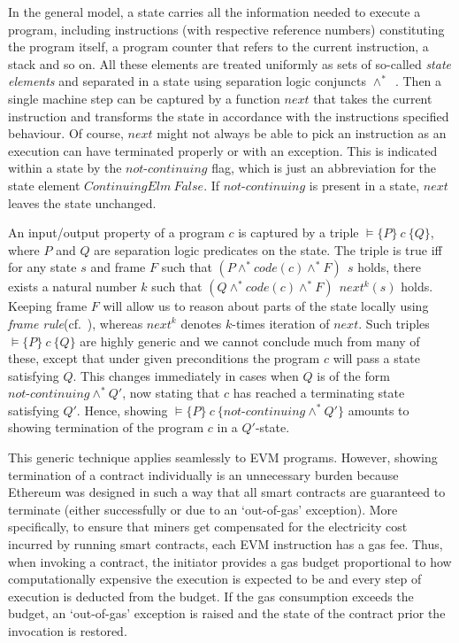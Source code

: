 \documentclass[sigplan,10pt,review]{acmart}\settopmatter{printfolios=true,printccs=false,printacmref=false}
\newcommand{\sconj}{\wedge^*}
\newcommand{\pvalid}[3]{\models\{#1\}\:#2\:\{#3\}}
\newcommand{\xnext}{\mathit{next}}
\newcommand{\code}[1]{\mathit{code}(#1)}
\newcommand{\ncont}{\mathit{not\mbox{-}continuing}}
\begin{document}
In the general model, a state carries all the information needed to execute a program, including
instructions (with respective reference numbers) constituting the program itself, a program counter that
refers to the current instruction, a stack and so on. All these elements are treated uniformly 
as sets of so-called \emph{state elements}
and separated in a state using separation logic conjuncts $\sconj$~\cite{Reynolds_02}.  
Then a single machine step can be captured by a function $\xnext$ that 
takes the current instruction and transforms the state in accordance with the instructions
specified behaviour. Of course, $\xnext$ might not always be able to pick an instruction
as an execution can have terminated properly or with an exception. This is indicated within a state
by the $\ncont$ flag, which is just an abbreviation for the state element 
$\mathit{ContinuingElm}\:False$. If $\ncont$ is present in a state, $\xnext$
leaves the state unchanged.   
   
An input/output property of a program $c$ is captured by a triple
$\pvalid{P}{c}{Q}$, where $P$ and $Q$ are separation logic predicates on the state.
The triple is true iff for any state $s$ and frame $F$ such that
$(P \sconj \code{c} \sconj F)\:\ s$ holds, there exists a natural number $k$ such that 
$(Q \sconj \code{c} \sconj F)\:\ \xnext^k(s)$ holds. 
Keeping frame $F$ will allow us to reason about parts of the state locally using \emph{frame rule}(cf.~\cite{Reynolds_02}),
whereas $\xnext^k$ denotes $k$-times iteration of $\xnext$.
Such triples $\pvalid{P}{c}{Q}$ are highly generic and we cannot conclude much from many of these, except that
under given preconditions the program $c$ will pass a state satisfying $Q$. This changes immediately in cases when $Q$ is of
the form $\ncont \sconj Q'$, now stating that $c$ has reached a terminating state satisfying $Q'$.
Hence, showing $\pvalid{P}{c}{\ncont \sconj Q'}$ amounts to showing termination of the program $c$ in
a $Q'$-state.

This generic technique applies seamlessly to EVM programs.
However, showing termination of a contract individually is an unnecessary burden because
Ethereum was designed in such a way that all smart contracts
are guaranteed to terminate (either successfully or due to an `out-of-gas' exception).
More specifically, to ensure that miners get compensated for the electricity cost
incurred by running smart contracts, each EVM instruction
has a gas fee.
Thus, when invoking a contract, the initiator provides a gas budget
proportional to how computationally expensive the execution is expected
to be and every step of execution is deducted from the budget.
If the gas consumption exceeds the budget, an `out-of-gas' exception is
raised and the state of the contract prior the
invocation is restored.
\end{document}
